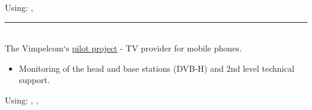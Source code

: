 Using: , 
\par\noindent\rule{\textwidth}{0.4pt}
% 
\\
The Vimpelcom`s \href{https://www.dvb.org/news/russia-to-launch-dvb-h-services}{pilot project} - TV provider for mobile phones.
\begin{itemize}
    \item Monitoring of the head and base stations (DVB-H) and 2nd level technical support.
\end{itemize}
Using: , , 

